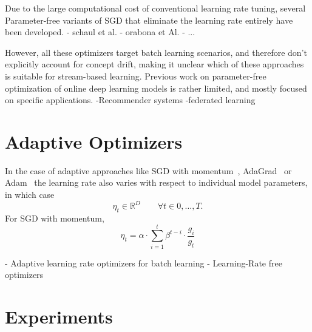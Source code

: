 \documentclass[letterpaper]{article} %
\begin{document}
Due to the large computational cost of conventional learning rate tuning, several Parameter-free variants of SGD that eliminate the learning rate entirely have been developed.
- schaul et al.
- orabona et Al.
- ...

However, all these optimizers target batch learning scenarios, and therefore don't explicitly account for concept drift, making it unclear which of these approaches is suitable for stream-based learning.
Previous work on parameter-free optimization of online deep learning models is rather limited, and mostly focused on specific applications.
-Recommender systems
-federated learning

\section{Adaptive Optimizers}\label{sec:adaptive_optims}

In the case of adaptive approaches like SGD with momentum~\cite{rumelhartLearningRepresentationsBackpropagating1986a}, AdaGrad~\cite{duchiAdaptiveSubgradientMethods2011} or Adam~\cite{kingmaAdamMethodStochastic2017b} the learning rate also varies with respect to individual model parameters, in which case
\begin{equation}
	\eta_t \in \mathbb{R}^{D} \qquad \forall t \in 0,\ldots,T.
\end{equation}
For SGD with momentum,
\begin{equation}
	\eta_t = \alpha \cdot \sum_{i=1}^{t} \beta^{t-i} \cdot \frac{g_i}{g_t}
\end{equation}

- Adaptive learning rate optimizers for batch learning \citep{kingmaAdamMethodStochastic2017b,zeilerADADELTAAdaptiveLearning2012a,duchiAdaptiveSubgradientMethods2011,tielemanLecture5rmspropDivide2012}
- Learning-Rate free optimizers \citep{wuWNGradLearnLearning2020,schaulNoMorePesky2013,orabonaTrainingDeepNetworks2017,miyaguchiCograConceptDriftAwareStochastic2019,
	vanervenMetaGradMultipleLearning2016a,baydinOnlineLearningRate2018}



\section{Experiments}
\end{document}
